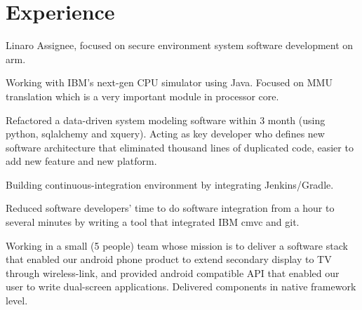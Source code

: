 \documentclass[letterpaper]{deedy-resume} %
\begin{document}
\begin{minipage}[t]{0.66\textwidth} %

\section{Experience}


\vspace{\topsep} %
\begin{tightitemize}
\item Linaro Assignee, focused on secure environment system software development on arm.
\end{tightitemize}

\sectionspace %



\begin{tightitemize}
\item Working with IBM’s next-gen CPU simulator using Java. Focused on MMU translation which is a very important module in processor core.
\item Refactored a data-driven system modeling software within 3 month (using python, sqlalchemy and xquery). Acting as key developer who defines new software architecture that eliminated thousand lines of duplicated code, easier to add new feature and new platform.
\item Building continuous-integration environment by integrating Jenkins/Gradle.
\item Reduced software developers’ time to do software integration from a hour to several minutes by writing a tool that integrated IBM cmvc and git.
\end{tightitemize}

\sectionspace %



\begin{tightitemize}
\item Working in a small (5 people) team whose mission is to deliver a software stack that enabled our android phone product to extend secondary display to TV through wireless-link, and provided android compatible API that enabled our user to write dual-screen applications. Delivered components in native framework level.
\end{tightitemize}


\end{minipage}
\end{document}
